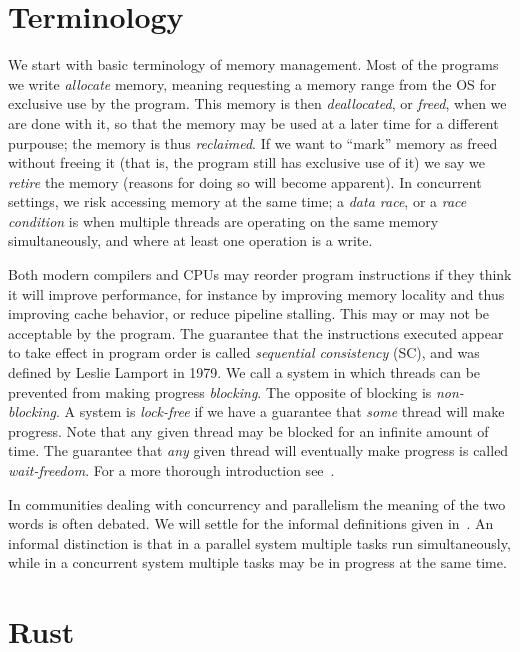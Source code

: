 \documentclass[b5paper]{report}
\begin{document}
\section{Terminology} We start with basic terminology of memory management. Most
of the programs we write \emph{allocate} memory, meaning requesting a memory
range from the OS for exclusive use by the program. This memory is then
\emph{deallocated}, or \emph{freed}, when we are done with it, so that the
memory may be used at a later time for a different purpouse; the memory is thus
\emph{reclaimed}. If we want to ``mark'' memory as freed without freeing it
(that is, the program still has exclusive use of it) we say we \emph{retire} the
memory (reasons for doing so will become apparent). In concurrent settings, we
risk accessing memory at the same time; a \emph{data race}, or a \emph{race
condition} is when multiple threads are operating on the same memory
simultaneously, and where at least one operation is a write.

Both modern compilers and CPUs may reorder program instructions if they think it
will improve performance, for instance by improving memory locality and thus
improving cache behavior, or reduce pipeline stalling. This may or may not be
acceptable by the program. The guarantee that the instructions executed appear
to take effect in program order is called \emph{sequential consistency} (SC),
and was defined by Leslie Lamport in 1979. We call a system in
which threads can be prevented from making progress \emph{blocking}. The
opposite of blocking is \emph{non-blocking}. A system is \emph{lock-free} if we
have a guarantee that \emph{some} thread will make progress. Note that any given
thread may be blocked for an infinite amount of time. The guarantee that
\emph{any} given thread will eventually make progress is called
\emph{wait-freedom}.  For a more thorough introduction
see~\cite{herlihy2011art}.

In communities dealing with concurrency and parallelism the meaning of the two
words is often debated. We will settle for the informal definitions given
in~\cite{pacheco2011introduction}. An informal distinction is that in a parallel
system multiple tasks run simultaneously, while in a concurrent system multiple
tasks may be in progress at the same time.


\section{Rust}\label{sec:rust}
\end{document}
